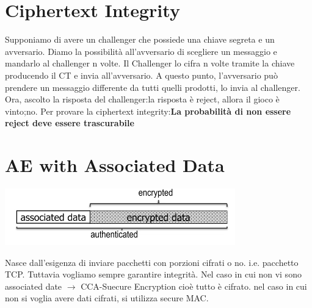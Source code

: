 \documentclass{book}
\theoremstyle{remark}
\begin{document}
\section{Ciphertext Integrity}
Supponiamo di avere un challenger che possiede una chiave segreta e un avversario\@. Diamo la possibilità all'avversario di
scegliere un messaggio e mandarlo al challenger n volte\@. Il Challenger lo cifra n volte tramite la chiave producendo il CT
e invia all'avversario\@. A questo punto, l'avversario può prendere un messaggio differente da tutti quelli prodotti, lo invia
al challenger\@. Ora, ascolto la risposta del challenger:\@se la risposta è reject, allora il gioco è vinto;\@altrimenti no\@.\newline
Per provare la ciphertext integrity:\textbf{La probabilità di non essere reject deve essere trascurabile}\newline
\section{AE with Associated Data}
\begin{center}
	\includegraphics*[scale=0.8]{2021-11-21-21-23-35.png}
\end{center}
Nasce dall'esigenza di inviare pacchetti con porzioni cifrati o no\@. i\@.e\@. pacchetto TCP\@. Tuttavia vogliamo sempre garantire
integrità\@.\newline
Nel caso in cui non vi sono associated date \(\rightarrow\) CCA-Suecure Encryption cioè tutto è cifrato\@. nel caso in cui non si
voglia avere dati cifrati, si utilizza secure MAC\@.
\end{document}
